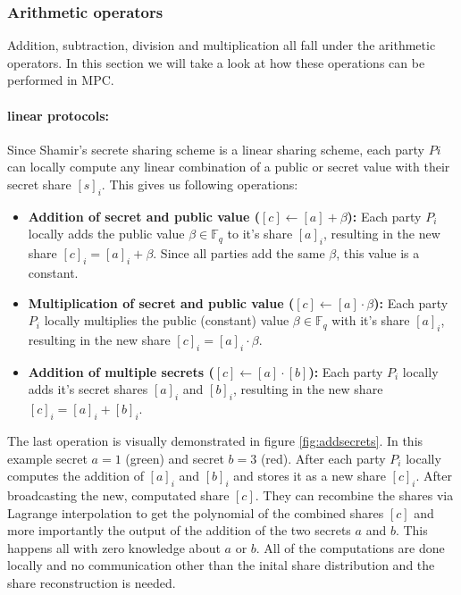 \subsubsection{Arithmetic operators}
Addition, subtraction, division and multiplication all fall under the arithmetic operators. In this section we will take a look at how these operations can be performed in MPC.
\paragraph{linear protocols:}
Since Shamir's secrete sharing scheme is a linear sharing scheme, each party $Pi$ can locally compute any linear combination of a public or secret value with their secret share $[s]_i$. This gives us following operations:
\begin{itemize}
  \item \textbf{Addition of secret and public value ($[c] \gets [a] + \beta$):} Each party $P_i$ locally adds the public value $\beta \in \mathbb{F}_q$ to it's share $[a]_i$, resulting in the new share $[c]_i = [a]_i + \beta$. Since all parties add the same $\beta$, this value is a constant.
  \item \textbf{Multiplication of secret and public value ($[c] \gets [a] \cdot \beta$):} Each party $P_i$ locally multiplies the public (constant) value $\beta \in \mathbb{F}_q$ with it's share $[a]_i$, resulting in the new share $[c]_i = [a]_i \cdot \beta$.
  \item \textbf{Addition of multiple secrets ($[c] \gets [a] \cdot [b]$):} Each party $P_i$ locally adds it's secret shares $[a]_i$ and $[b]_i$, resulting in the new share $[c]_i = [a]_i + [b]_i$.
\end{itemize}

The last operation is visually demonstrated in figure \ref{fig:addsecrets}. In this example secret $a=1$ (green) and secret $b=3$ (red). After each party $P_i$ locally computes the addition of $[a]_i$ and $[b]_i$ and stores it as a new share $[c]_i$. After broadcasting the new, computated share $[c]$. They can recombine the shares via Lagrange interpolation to get the polynomial of the combined shares $[c]$ and more importantly the output of the addition of the two secrets $a$ and $b$. This happens all with zero knowledge about $a$ or $b$. All of the computations are done locally and no communication other than the inital share distribution and the share reconstruction is needed.

